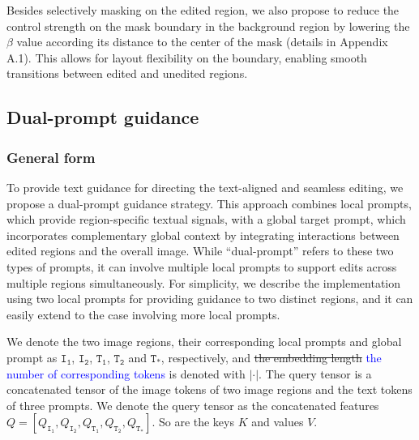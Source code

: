 \documentclass{article}
\newcommand{\kc}[1]{\textcolor{blue}{#1}}
\begin{document}
Besides selectively masking on the edited region, we also propose to reduce the control strength on the mask boundary in the background region by lowering the $\beta$ value according its distance to the center of the mask (details in Appendix A.1). This allows for layout flexibility on the boundary, enabling smooth transitions between edited and unedited regions.  









\subsection{Dual-prompt guidance}
\label{sec:dualprompt}

\subsubsection{General form}
To provide text guidance for directing the text-aligned and seamless editing, we propose a dual-prompt guidance strategy. This approach combines local prompts, which provide region-specific textual signals, with a global target prompt, which incorporates complementary global context by integrating interactions between edited regions and the overall image. While ``dual-prompt'' refers to these two types of prompts, it can involve multiple local prompts to support edits across multiple regions simultaneously. For simplicity, we describe the implementation using two local prompts for providing guidance to two distinct regions, and it can easily extend to the case involving more local prompts.

We denote the two image regions, their corresponding local prompts and global prompt  as $\texttt{I}_\texttt{1}$,  $\texttt{I}_\texttt{2}$,  $\texttt{T}_\texttt{1}$, $\texttt{T}_\texttt{2}$ and $\texttt{T}_\texttt{*}$, respectively, and \sout{the embedding length} \kc{the number of corresponding tokens} is denoted with $|\cdot|$. The query tensor is a concatenated tensor of the image tokens of two image regions and the text tokens of three prompts. We denote the query tensor as the concatenated features $ Q= [Q_{\texttt{I}_\texttt{1}}, Q_{\texttt{I}_\texttt{2}}, Q_{\texttt{T}_\texttt{1}}, Q_{\texttt{T}_\texttt{2}}, Q_{\texttt{T}_\texttt{*}}]$. So are the keys $K$ and values $V$. 
\end{document}
